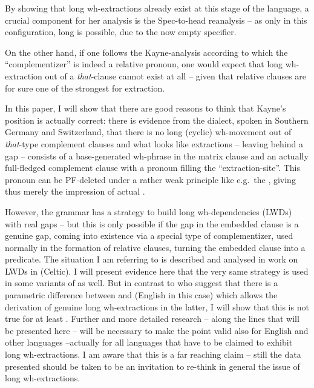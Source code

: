 \documentclass[output=paper]{langsci/langscibook}
\begin{document}
By showing that long wh-extractions already exist at this stage of the
language, a crucial component for her analysis is the Spec-to-head reanalysis –
as only in this configuration, long  is possible, due to the
now empty specifier.

On the other hand, if one follows the Kayne-analysis according to which the
\enquote{complementizer} is indeed a relative pronoun, one would expect that long
wh-extraction out of a \emph{that}-clause cannot exist at all – given that
relative clauses are for sure one of the strongest  for extraction.

In this paper, I will show that there are good reasons to think that Kayne’s
position is actually correct: there is evidence from the  dialect,
spoken in Southern Germany and Switzerland, that there is no long (cyclic)
wh-movement out of \emph{that}-type complement clauses and what looks like
extractions – leaving behind a gap – consists of a base-generated wh-phrase in
the matrix clause and an actually full-fledged complement clause with a
pronoun filling the \enquote{extraction-site}. This pronoun can be PF-deleted under a
rather weak principle like e.g.\ the 
\citep{Chomsky1981}, giving thus merely the impression of actual .

However, the grammar has a strategy to build long wh-dependencies
(\glspl{LWD}) with real gaps – but this is only possible if the
gap in the embedded clause is a genuine gap, coming into existence via a
special type of complementizer, used normally in the formation of relative
clauses, turning the embedded clause into a predicate. The situation I am
referring to is described and analysed in  work on
\glspl{LWD} in  (Celtic). I will present evidence here that the very same
strategy is used in some variants of  as well. But in contrast to
\citet{AdgRam2005} who suggest that there is a parametric difference
between  and  (English in this case) which allows the derivation
of genuine long wh-extractions in the latter, I will show that this is not true
for at least . Further and more detailed research – along the lines
that will be presented here – will be necessary to make the point valid also
for English and other  languages –actually for all languages that have
to be claimed to exhibit long wh-extractions. I am aware that this is a far
reaching claim – still the data presented should be taken to be an invitation
to re-think in general the issue of long wh-extractions.
\end{document}
